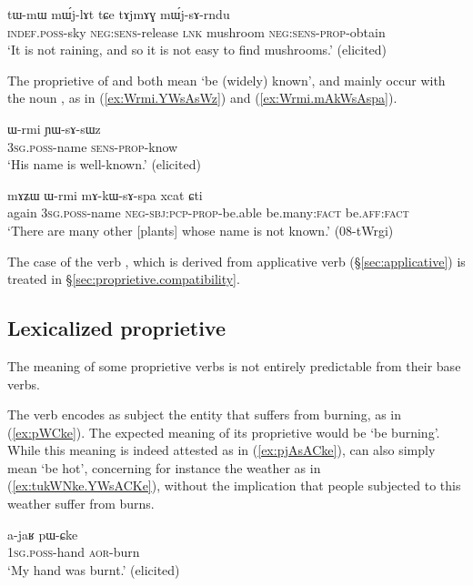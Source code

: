 \begin{exe}
\ex \label{ex:tAjmAG.mWjsArndu}
\gll tɯ-mɯ mɯ́j-lɤt tɕe tɤjmɤɣ mɯ́j-sɤ-rndu\\
\textsc{indef}.\textsc{poss}-sky \textsc{neg}:\textsc{sens}-release \textsc{lnk} mushroom \textsc{neg}:\textsc{sens}-\textsc{prop}-obtain\\
\glt `It is not raining, and so it is not easy to find mushrooms.' (elicited)
\end{exe}

The proprietive of  and  both mean `be (widely) known', and mainly occur with the noun , as in (\ref{ex:Wrmi.YWsAsWz}) and (\ref{ex:Wrmi.mAkWsAspa}).

\begin{exe}
\ex \label{ex:Wrmi.YWsAsWz}
\gll ɯ-rmi ɲɯ-sɤ-sɯz \\
\textsc{3sg}.\textsc{poss}-name \textsc{sens}-\textsc{prop}-know \\
\glt `His name is well-known.' (elicited)
\end{exe}

\begin{exe}
\ex \label{ex:Wrmi.mAkWsAspa}
\gll mɤʑɯ ɯ-rmi mɤ-kɯ-sɤ-spa xcat ɕti \\
again \textsc{3sg}.\textsc{poss}-name \textsc{neg}-\textsc{sbj}:\textsc{pcp}-\textsc{prop}-be.able be.many:\textsc{fact} be.\textsc{aff}:\textsc{fact} \\
\glt `There are many other [plants] whose name is not known.' (08-tWrgi) 
\end{exe}
 
The case of the verb , which is derived from applicative verb  (§\ref{sec:applicative}) is treated in §\ref{sec:proprietive.compatibility}.
  

\subsection{Lexicalized proprietive} \label{sec:proprietive.lexicalized}
The meaning of some proprietive verbs is not entirely predictable from their base verbs. 

The verb  encodes as subject the entity that suffers from burning, as in (\ref{ex:pWCke}). The expected meaning of its proprietive  would be `be burning'. While this meaning is indeed attested as in (\ref{ex:pjAsACke}),  can also simply mean `be hot', concerning for instance the weather as in (\ref{ex:tukWNke.YWsACKe}), without the implication that people subjected to this weather suffer from burns.
\largerpage
\begin{exe}
\ex \label{ex:pWCke}
\gll a-jaʁ pɯ-ɕke \\
\textsc{1sg}.\textsc{poss}-hand \textsc{aor}-burn \\
\glt `My hand was burnt.' (elicited)
\end{exe}

